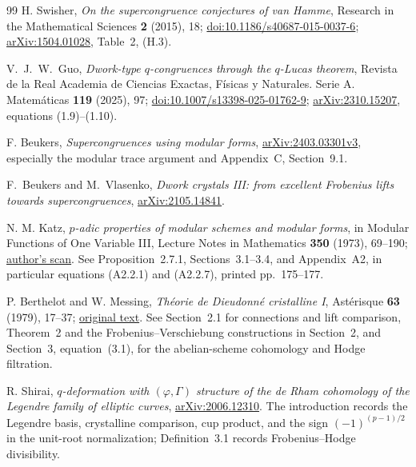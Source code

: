 \documentclass[11pt,a4paper]{article}
\begin{document}
\begin{thebibliography}{99}
H. Swisher, \emph{On the supercongruence conjectures of van Hamme},
Research in the Mathematical Sciences \textbf{2} (2015), 18;
\href{https://doi.org/10.1186/s40687-015-0037-6}{doi:10.1186/s40687-015-0037-6};
\href{https://arxiv.org/abs/1504.01028}{arXiv:1504.01028}, Table~2, (H.3).

 V.~J.~W.~Guo, \emph{Dwork-type $q$-congruences through
the $q$-Lucas theorem}, Revista de la Real Academia de Ciencias Exactas,
F\'isicas y Naturales. Serie A. Matem\'aticas \textbf{119} (2025), 97;
\href{https://doi.org/10.1007/s13398-025-01762-9}{doi:10.1007/s13398-025-01762-9};
\href{https://arxiv.org/abs/2310.15207}{arXiv:2310.15207}, equations (1.9)--(1.10).

F. Beukers, \emph{Supercongruences using modular forms},
\href{https://arxiv.org/abs/2403.03301v3}{arXiv:2403.03301v3},
especially the modular trace argument and Appendix~C, Section~9.1.

 F.~Beukers and M.~Vlasenko, \emph{Dwork crystals III:
from excellent Frobenius lifts towards supercongruences},
\href{https://arxiv.org/abs/2105.14841}{arXiv:2105.14841}.

N. M. Katz, \emph{$p$-adic properties of modular schemes and modular forms},
in Modular Functions of One Variable III, Lecture Notes in Mathematics
\textbf{350} (1973), 69--190;
\href{https://web.math.princeton.edu/~nmk/old/padicpropMFMS.pdf}{author's scan}.
See Proposition~2.7.1, Sections~3.1--3.4, and Appendix~A2, in particular
equations (A2.2.1) and (A2.2.7), printed pp.~175--177.

P. Berthelot and W. Messing, \emph{Th\'eorie de Dieudonn\'e cristalline I},
Ast\'erisque \textbf{63} (1979), 17--37;
\href{https://numdam.org/item/AST_1979__63__17_0.pdf}{original text}.
See Section~2.1 for connections and lift comparison, Theorem~2 and the
Frobenius--Verschiebung constructions in Section~2, and Section~3,
equation~(3.1), for the abelian-scheme cohomology and Hodge filtration.

R. Shirai, \emph{$q$-deformation with $(\varphi,\Gamma)$ structure of the
de Rham cohomology of the Legendre family of elliptic curves},
\href{https://arxiv.org/abs/2006.12310}{arXiv:2006.12310}.
The introduction records the Legendre basis, crystalline comparison,
cup product, and the sign $(-1)^{(p-1)/2}$ in the unit-root normalization;
Definition~3.1 records Frobenius--Hodge divisibility.


\end{thebibliography}
\end{document}
